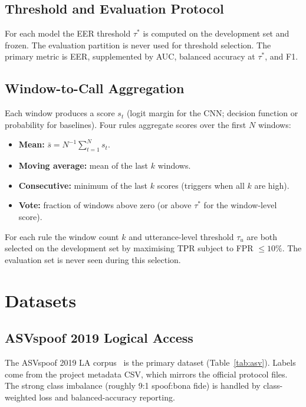 \documentclass[conference]{IEEEtran}
\begin{document}
\subsection{Threshold and Evaluation Protocol}

For each model the EER threshold $\tau^*$ is computed on the development set and frozen. The evaluation partition is never used for threshold selection. The primary metric is EER, supplemented by AUC, balanced accuracy at $\tau^*$, and F1.

\subsection{Window-to-Call Aggregation}

Each window produces a score $s_t$ (logit margin for the CNN; decision function or probability for baselines). Four rules aggregate scores over the first $N$ windows:
\begin{itemize}
  \item \textbf{Mean:} $\bar{s} = N^{-1}\sum_{t=1}^N s_t$.
  \item \textbf{Moving average:} mean of the last $k$ windows.
  \item \textbf{Consecutive:} minimum of the last $k$ scores (triggers when all $k$ are high).
  \item \textbf{Vote:} fraction of windows above zero (or above $\tau^*$ for the window-level score).
\end{itemize}
For each rule the window count $k$ and utterance-level threshold $\tau_u$ are both selected on the development set by maximising TPR subject to FPR $\leq 10\%$. The evaluation set is never seen during this selection.

\section{Datasets}

\subsection{ASVspoof 2019 Logical Access}

The ASVspoof 2019 LA corpus~\cite{asvspoof2019} is the primary dataset (Table~\ref{tab:asv}). Labels come from the project metadata CSV, which mirrors the official protocol files. The strong class imbalance (roughly 9:1 spoof:bona fide) is handled by class-weighted loss and balanced-accuracy reporting.
\end{document}
